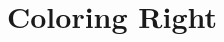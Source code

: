 \documentclass[11pt]{article}
\begin{document}
\title{Coloring Right}
\author{}
\date{}
\maketitle
\end{document}

